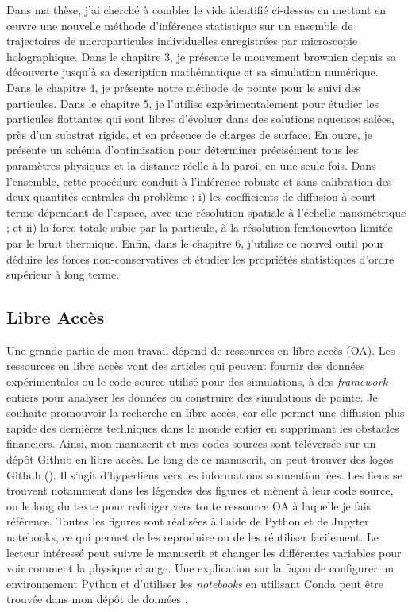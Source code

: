 Dans ma thèse, j'ai cherché à combler le vide identifié ci-dessus en mettant en œuvre une nouvelle méthode d'inférence statistique sur un ensemble de trajectoires de microparticules individuelles enregistrées par microscopie holographique. Dans le chapitre 3, je présente le mouvement brownien depuis sa découverte jusqu'à sa description mathématique et sa simulation numérique. Dans le chapitre 4, je présente notre méthode de pointe pour le suivi des particules. Dans le chapitre 5, je l'utilise expérimentalement pour étudier les particules flottantes qui sont libres d'évoluer dans des solutions aqueuses salées, près d'un substrat rigide, et en présence de charges de surface. En outre, je présente un schéma d'optimisation pour déterminer précisément tous les paramètres physiques et la distance réelle à la paroi, en une seule fois. Dans l'ensemble, cette procédure conduit à l'inférence robuste et sans calibration des deux quantités centrales du problème : i) les coefficients de diffusion à court terme dépendant de l'espace, avec une résolution spatiale à l'échelle nanométrique ; et ii) la force totale subie par la particule, à la résolution femtonewton limitée par le bruit thermique. Enfin, dans le chapitre 6, j'utilise ce nouvel outil pour déduire les forces non-conservatives et étudier les propriétés statistiques d'ordre supérieur à long terme.




\subsection{Libre Accès}

Une grande partie de mon travail dépend de ressources en libre accès (OA). Les ressources en libre accès vont des articles qui peuvent fournir des données expérimentales ou le code source utilisé pour des simulations, à des \textit{framework} entiers pour analyser les données ou construire des simulations de pointe. Je souhaite promouvoir la recherche en libre accès, car elle permet une diffusion plus rapide des dernières techniques dans le monde entier en supprimant les obstacles financiers. Ainsi, mon manuscrit et mes codes sources sont téléversée sur un dépôt Github en libre accès. Le long de ce manuscrit, on peut trouver des logos Github (\href{https://github.com/eXpensia/Ma-these/}{\faGithub}). Il s'agit d'hyperliens vers les informations susmentionnées. Les liens se trouvent notamment dans les légendes des figures et mènent à leur code source, ou le long du texte pour rediriger vers toute ressource OA à laquelle je fais référence. Toutes les figures sont réalisées à l'aide de Python et de Jupyter notebooks, ce qui permet de les reproduire ou de les réutiliser facilement. Le lecteur intéressé peut suivre le manuscrit et changer les différentes variables pour voir comment la physique change.  Une explication sur la façon de configurer un environnement Python et d'utiliser les \textit{notebooks} en utilisant Conda peut être trouvée dans mon dépôt de données \href{https://github.com/eXpensia/Ma-these/}{\faGithub}.



